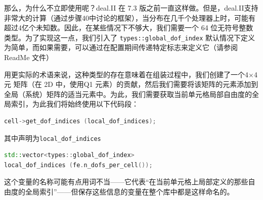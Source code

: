 \documentclass[12pt, a4paper]{article}
\numberwithin{equation}{section} %
\begin{document}
那么，为什么不立即使用呢？deal.II 在 7.3 版之前一直这样做。但是，deal.II支持非常大的计算（通过步骤40中讨论的框架），当分布在几千个处理器上时，可能有超过4亿个未知数。因此，在某些情况下不够大，我们需要一个 64 位无符号整数类型。为了实现这一点，我们引入了 \verb|types::global_dof_index| 默认情况下定义为简单，而如果需要，可以通过在配置期间传递特定标志来定义它（请参阅 ReadMe 文件）


用更实际的术语来说，这种类型的存在意味着在组装过程中，我们创建了一个4×4 元
矩阵（在 2D 中，使用Q1
元素）的贡献，然后我们需要将该矩阵的元素添加到全局（系统）矩阵的适当元素中。为此，我们需要获取当前单元格局部自由度的全局索引，为此我们将始终使用以下代码段：
\begin{lstlisting}[language=c++]
cell->get_dof_indices (local_dof_indices);
\end{lstlisting}
其中声明为\verb|local_dof_indices|
\begin{lstlisting}[language=c++]
std::vector<types::global_dof_index> 
local_dof_indices (fe.n_dofs_per_cell());
\end{lstlisting}
这个变量的名称可能有点用词不当——它代表“在当前单元格上局部定义的那些自由度的全局索引”——但保存这些信息的变量在整个库中都是这样命名的。


\newpage


\end{document}

